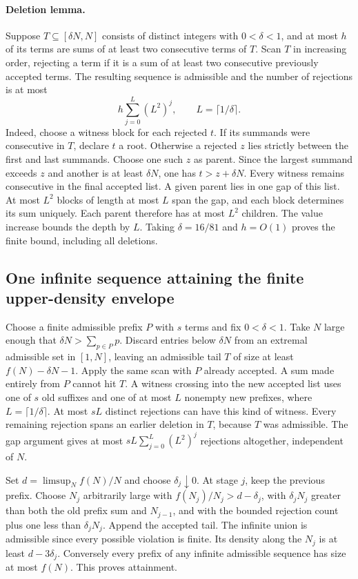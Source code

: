 \documentclass[11pt]{article}
\begin{document}
\paragraph{Deletion lemma.}
Suppose $T\subseteq[\delta N,N]$ consists of distinct integers with $0<\delta<1$, and at most $h$ of its terms are sums of at least two consecutive terms of $T$. Scan $T$ in increasing order, rejecting a term if it is a sum of at least two consecutive previously accepted terms. The resulting sequence is admissible and the number of rejections is at most
\[
 h\sum_{j=0}^{L}(L^2)^j,\qquad L=\lceil1/\delta\rceil.
\]
Indeed, choose a witness block for each rejected $t$. If its summands were consecutive in $T$, declare $t$ a root. Otherwise a rejected $z$ lies strictly between the first and last summands. Choose one such $z$ as parent. Since the largest summand exceeds $z$ and another is at least $\delta N$, one has $t>z+\delta N$. Every witness remains consecutive in the final accepted list. A given parent lies in one gap of this list. At most $L^2$ blocks of length at most $L$ span the gap, and each block determines its sum uniquely. Each parent therefore has at most $L^2$ children. The value increase bounds the depth by $L$. Taking $\delta=16/81$ and $h=O(1)$ proves the finite bound, including all deletions.

\subsection{One infinite sequence attaining the finite upper-density envelope}
Choose a finite admissible prefix $P$ with $s$ terms and fix $0<\delta<1$. Take $N$ large enough that $\delta N>\sum_{p\in P}p$. Discard entries below $\delta N$ from an extremal admissible set in $[1,N]$, leaving an admissible tail $T$ of size at least $f(N)-\delta N-1$. Apply the same scan with $P$ already accepted. A sum made entirely from $P$ cannot hit $T$. A witness crossing into the new accepted list uses one of $s$ old suffixes and one of at most $L$ nonempty new prefixes, where $L=\lceil1/\delta\rceil$. At most $sL$ distinct rejections can have this kind of witness. Every remaining rejection spans an earlier deletion in $T$, because $T$ was admissible. The gap argument gives at most $sL\sum_{j=0}^{L}(L^2)^j$ rejections altogether, independent of $N$.

Set $d=\limsup_N f(N)/N$ and choose $\delta_j\downarrow0$. At stage $j$, keep the previous prefix. Choose $N_j$ arbitrarily large with $f(N_j)/N_j>d-\delta_j$, with $\delta_jN_j$ greater than both the old prefix sum and $N_{j-1}$, and with the bounded rejection count plus one less than $\delta_jN_j$. Append the accepted tail. The infinite union is admissible since every possible violation is finite. Its density along the $N_j$ is at least $d-3\delta_j$. Conversely every prefix of any infinite admissible sequence has size at most $f(N)$. This proves attainment.
\end{document}
